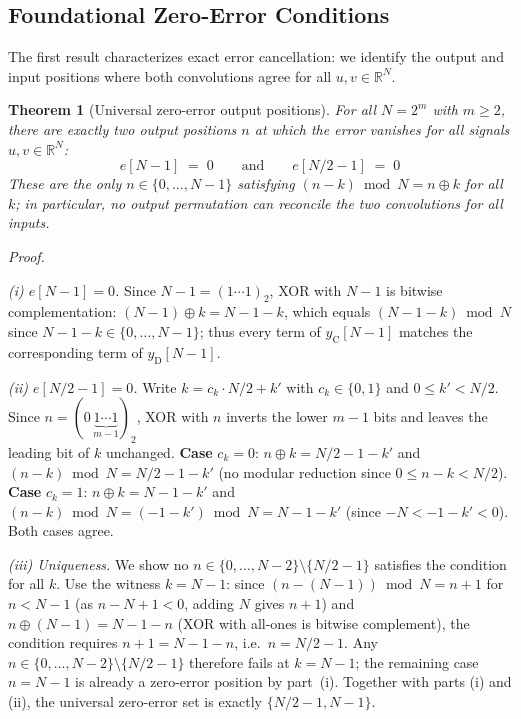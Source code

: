 \documentclass[10pt,a4paper]{amsart}
\newtheorem{theorem}{Theorem}
\begin{document}
\subsection{Foundational Zero-Error Conditions}
\label{sec:foundational}

The first result characterizes exact error cancellation: we identify the output and input positions where both convolutions agree for all $u, v \in \mathbb{R}^N$.

\begin{theorem}[Universal zero-error output positions]\label{thm:zero-error}
For all $N = 2^m$ with $m \geq 2$, there are exactly two output positions $n$ at which the error vanishes for all signals $u, v \in \mathbb{R}^N$:
\begin{equation}
    e[N-1] \;=\; 0 \qquad \text{and} \qquad e[N/2 - 1] \;=\; 0
\end{equation}
These are the only $n \in \{0,\ldots,N-1\}$ satisfying $(n-k)\bmod N = n \oplus k$ for all $k$; in particular, no output permutation can reconcile the two convolutions for all inputs.
\end{theorem}

\noindent\textit{Proof.}

\smallskip
\noindent\textit{(i) $e[N-1] = 0$.} Since $N-1=(1\cdots1)_2$, XOR with $N-1$ is bitwise complementation: $(N-1)\oplus k = N-1-k$, which equals $(N-1-k)\bmod N$ since $N-1-k\in\{0,\ldots,N-1\}$; thus every term of $y_{\mathrm{C}}[N-1]$ matches the corresponding term of $y_{\mathrm{D}}[N-1]$.

\smallskip
\noindent\textit{(ii) $e[N/2 - 1] = 0$.} Write $k = c_k\cdot N/2 + k'$ with $c_k\in\{0,1\}$ and $0\leq k'<N/2$. Since $n=(0\,\underbrace{1\cdots 1}_{m-1})_2$, XOR with $n$ inverts the lower $m-1$ bits and leaves the leading bit of $k$ unchanged. \textbf{Case} $c_k=0$: $n\oplus k = N/2-1-k'$ and $(n-k)\bmod N = N/2-1-k'$ (no modular reduction since $0\leq n-k < N/2$). \textbf{Case} $c_k=1$: $n\oplus k = N-1-k'$ and $(n-k)\bmod N = (-1-k')\bmod N = N-1-k'$ (since $-N<-1-k'<0$). Both cases agree.

\smallskip
\noindent\textit{(iii) Uniqueness.} We show no $n \in \{0,\ldots,N-2\}\setminus\{N/2-1\}$ satisfies the condition for all $k$. Use the witness $k = N-1$: since $(n-(N-1))\bmod N = n+1$ for $n < N-1$ (as $n-N+1<0$, adding $N$ gives $n+1$) and $n\oplus(N-1)=N-1-n$ (XOR with all-ones is bitwise complement), the condition requires $n+1 = N-1-n$, i.e.\ $n = N/2-1$. Any $n\in\{0,\ldots,N-2\}\setminus\{N/2-1\}$ therefore fails at $k=N-1$; the remaining case $n=N-1$ is already a zero-error position by part~(i). Together with parts (i) and (ii), the universal zero-error set is exactly $\{N/2-1,N-1\}$.
\end{document}
